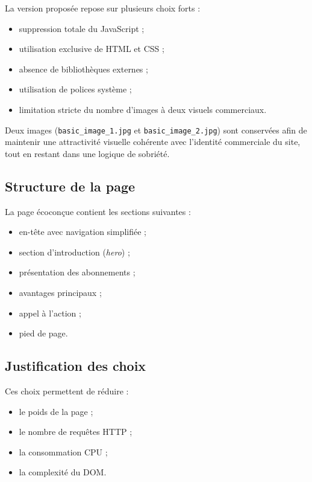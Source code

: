 \documentclass[11pt,a4paper]{article}
\begin{document}
La version proposée repose sur plusieurs choix forts :

\begin{itemize}
\item suppression totale du JavaScript ;
\item utilisation exclusive de HTML et CSS ;
\item absence de bibliothèques externes ;
\item utilisation de polices système ;
\item limitation stricte du nombre d'images à deux visuels commerciaux.
\end{itemize}

Deux images (\texttt{basic\_image\_1.jpg} et \texttt{basic\_image\_2.jpg}) sont conservées afin de maintenir une attractivité visuelle cohérente avec l'identité commerciale du site, tout en restant dans une logique de sobriété.

\subsection{Structure de la page}

La page écoconçue contient les sections suivantes :

\begin{itemize}
\item en-tête avec navigation simplifiée ;
\item section d'introduction (\textit{hero}) ;
\item présentation des abonnements ;
\item avantages principaux ;
\item appel à l'action ;
\item pied de page.
\end{itemize}

\subsection{Justification des choix}

Ces choix permettent de réduire :

\begin{itemize}
\item le poids de la page ;
\item le nombre de requêtes HTTP ;
\item la consommation CPU ;
\item la complexité du DOM.
\end{itemize}
\end{document}

